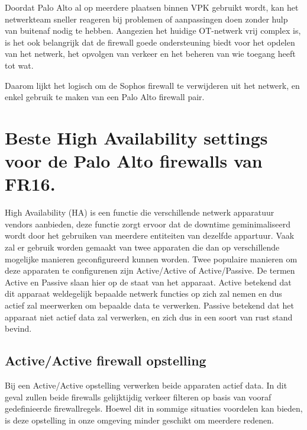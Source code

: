Doordat Palo Alto al op meerdere plaatsen binnen VPK gebruikt wordt, kan het netwerkteam sneller reageren bij problemen of aanpassingen doen zonder hulp van buitenaf nodig te hebben. Aangezien het huidige OT-netwerk vrij complex is, is het ook belangrijk dat de firewall goede ondersteuning biedt voor het opdelen van het netwerk, het opvolgen van verkeer en het beheren van wie toegang heeft tot wat.

Daarom lijkt het logisch om de Sophos firewall te verwijderen uit het netwerk, en enkel gebruik te maken van een Palo Alto firewall pair.

\newpage

\section{Beste High Availability settings voor de Palo Alto firewalls van FR16.}


High Availability (HA) is een functie die verschillende netwerk apparatuur vendors aanbieden, deze functie zorgt ervoor dat de downtime geminimaliseerd wordt door het gebruiken van meerdere entiteiten van dezelfde appartuur. Vaak zal er gebruik worden gemaakt van twee apparaten die dan op verschillende mogelijke manieren geconfigureerd kunnen worden. Twee populaire manieren om deze apparaten te configurenen zijn Active/Active of Active/Passive. De termen Active en Passive slaan hier op de staat van het apparaat. Active betekend dat dit apparaat weldegelijk bepaalde netwerk functies op zich zal nemen en dus actief zal meerwerken om bepaalde data te verwerken. Passive betekend dat het apparaat niet actief data zal verwerken, en zich dus in een soort van rust stand bevind.

\subsection{Active/Active firewall opstelling}
Bij een Active/Active opstelling verwerken beide apparaten actief data. In dit geval zullen beide firewalls gelijktijdig verkeer filteren op basis van vooraf gedefinieerde firewallregels. Hoewel dit in sommige situaties voordelen kan bieden, is deze opstelling in onze omgeving minder geschikt om meerdere redenen.
\newline



